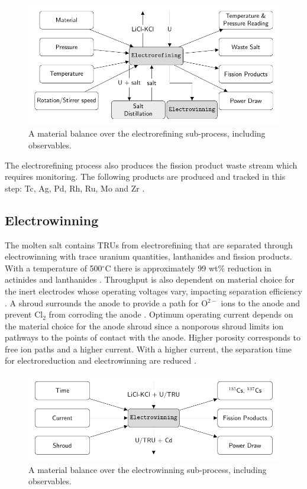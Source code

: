 \documentclass{anstrans}
\begin{document}
\begin{figure}[ht]
	\centering
	\includegraphics[width=0.9\linewidth]{refining}
	\caption{A material balance over the electrorefining sub-process, including observables.}
	\label{fig:refining}
\end{figure}

The electrorefining process also produces the fission product waste stream which requires monitoring. The following products are produced 
and tracked in this step: Tc, Ag, Pd, Rh, Ru, Mo and Zr \cite{flowsheet_1998}.

\subsection{Electrowinning}

The molten salt contains TRUs from electrorefining that are separated through electrowinning with trace uranium quantities, lanthanides and fission products. 
With a temperature of 500$^{\circ}$C there is approximately 99 wt\% reduction in actinides and lanthanides \cite{flowsheet_1998}. 
Throughput is also dependent on material choice for the inert electrodes whose operating voltages vary, impacting separation 
efficiency \cite{koyama_development_2012}. A shroud surrounds the anode to provide a path for O$^{2-}$ ions to the anode and 
prevent Cl$_2$ from corroding the anode \cite{kim_development_2013,choi_electrochemical_2015}. Optimum operating current 
depends on the material choice for the anode shroud since a nonporous shroud limits ion pathways to the points of contact 
with the anode. Higher porosity corresponds to free ion paths and a higher current. With a higher current, the separation 
time for electroreduction and electrowinning are reduced \cite{choi_electrochemical_2015}.

\begin{figure}[ht]
	\centering
	\includegraphics[width=1\linewidth]{winning}
	\caption{A material balance over the electrowinning sub-process, including observables.}
	\label{fig:winning}
\end{figure}
\end{document}
